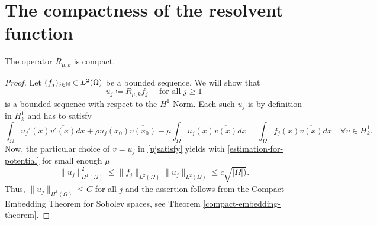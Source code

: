 \section{The compactness of the resolvent function} \label{sec:4.2}

\begin{theorem} \label{3.1:thm-Rmuk.isCompact}
	The operator $R_{\mu, k}$ is compact.

	\begin{proof}
	Let $(f_{j})_{j \in \mathbb{N}} \in L^{2}(\Omega)$ be a  bounded sequence. We will show that 
		\[ u_{j} \coloneqq R_{\mu, k} f_{j} \quad \text{ for all } j \geq 1 \]
	is a bounded sequence with respect to the $H^{1}$-Norm. Each such $u_{j}$ is by definition in $H^{1}_{k}$ and has to satisfy
		\begin{equation}
			\int_{\Omega} u_{j}'(x) \overline{v'(x)} dx + \rho u_{j}(x_{0}) \overline{v(x_{0})} - \mu \int_{\Omega} u_{j}(x) \overline{v(x)} dx = \int_{\Omega} f_{j}(x) \overline{v(x)} dx \quad \forall v \in H^{1}_{k}. \label{ujsatisfy}
		\end{equation} 
	Now, the particular choice of $v = u_{j}$ in \eqref{ujsatisfy} yields with \eqref{estimation-for-potential} for small enough $\mu$
		\[  \| u_{j} \|_{H^{1}(\Omega)}^{2} \leq \| f_{j} \|_{L^{2}(\Omega)} \| u_{j} \|_{L^{2}(\Omega)} \leq c \sqrt{|\Omega|)}. \]
	Thus, $\| u_{j} \|_{H^{1}(\Omega)} \leq C$ for all $j$ and the assertion follows from the Compact Embedding Theorem for Sobolev spaces, see Theorem \ref{compact-embedding-theorem}.
	\end{proof}	
\end{theorem}		

